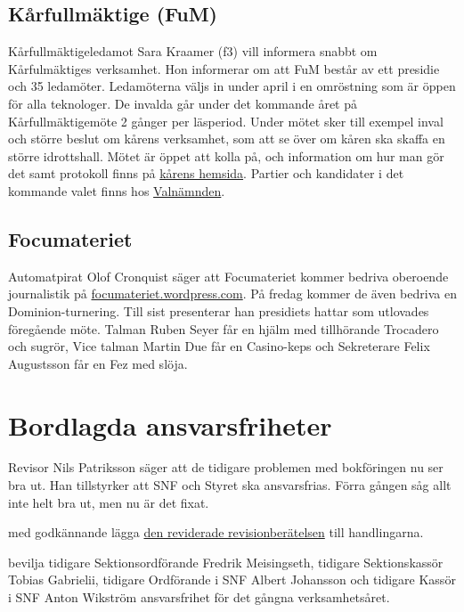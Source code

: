 \documentclass[hidelinks]{sektionsmote} %
\begin{document}
\subsection{Kårfullmäktige (FuM)}
Kårfullmäktigeledamot Sara Kraamer (f3) vill informera snabbt om Kårfulmäktiges verksamhet.
Hon informerar om att FuM består av ett presidie och 35 ledamöter.
Ledamöterna väljs in under april i en omröstning som är öppen för alla teknologer.
De invalda går under det kommande året på Kårfullmäktigemöte 2 gånger per läsperiod.
Under mötet sker till exempel inval och större beslut om kårens verksamhet, som att se över om kåren ska skaffa en större idrottshall.
Mötet är öppet att kolla på, och information om hur man gör det samt protokoll finns på \href{https://chalmersstudentkar.se/union-council/}{kårens hemsida}.
Partier och kandidater i det kommande valet finns hos \href{https://www.facebook.com/fumval/}{Valnämnden}.

\subsection{Focumateriet}
Automatpirat Olof Cronquist säger att Focumateriet kommer bedriva oberoende journalistik på \href{focumateriet.wordpress.com}{focumateriet.wordpress.com}.
På fredag kommer de även bedriva en Dominion-turnering.
Till sist presenterar han presidiets hattar som utlovades föregående möte.
Talman Ruben Seyer får en hjälm med tillhörande Trocadero och sugrör, Vice talman Martin Due får en Casino-keps och Sekreterare Felix Augustsson får en Fez med slöja.


\section{Bordlagda ansvarsfriheter}
Revisor Nils Patriksson säger att de tidigare problemen med bokföringen nu ser bra ut.
Han tillstyrker att SNF och Styret ska ansvarsfrias.
Förra gången såg allt inte helt bra ut, men nu är det fixat.
\begin{beslut}
  \item med godkännande lägga \hyperlink{bilagor/revisionsnf1920.pdf.1}{den reviderade revisionberätelsen} till handlingarna.
  \item bevilja tidigare Sektionsordförande Fredrik Meisingseth, tidigare Sektionskassör Tobias Gabrielii, tidigare Ordförande i SNF Albert Johansson och tidigare Kassör i SNF Anton Wikström ansvarsfrihet för det gångna verksamhetsåret.
\end{beslut}
\end{document}
